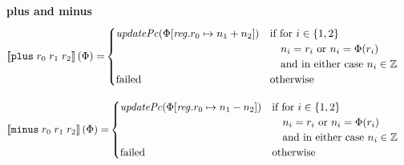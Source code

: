 \documentclass[a4paper]{article}
\newcommand{\sem}[1]{\left\llbracket #1 \right\rrbracket}
\newcommand{\targetcolor}[1]{\color{black}}
\newcommand{\trg}[1]{{\targetcolor{} #1}}
\newcommand{\zinstr}[1]{\texttt{#1}}
\newcommand{\threeinstr}[4]{
  \ifthenelse{\equal{#2#3#4}{}}
  {\zinstr{#1}}
  {\zinstr{#1} \; #2 \; #3 \; #4}
}
\newcommand{\tplus}[3]{\threeinstr{\trg{plus}}{#1}{#2}{#3}}
\newcommand{\tminus}[3]{\threeinstr{\trg{minus}}{#1}{#2}{#3}}
\newcommand{\ints}{\mathbb{Z}}
\newcommand{\update}[2]{[#1 \mapsto #2]}
\newcommand{\updReg}[2]{\update{\reg.#1}{#2}}
\newcommand{\failed}{\mathrm{failed}}
\newcommand{\var}[1]{\mathit{#1}}
\newcommand{\reg}{\var{reg}}
\newcommand{\plainfun}[2]{
  \ifthenelse{\equal{#2}{}}
  {\mathit{#1}}
  {\mathit{#1}(#2)}
}
\newcommand{\updPcAddr}[1]{\plainfun{updatePc}{#1}}
\begin{document}
\noindent\textbf{plus and minus}\\
\begin{align*}
  \sem{\tplus{r_0}{r_1}{r_2}}(\Phi) = &
                                                  \begin{cases}
                                                    \updPcAddr{\Phi\updReg{r_0}{n_1+n_2}} &
                                                    \arraycolsep=0pt
                                                    \begin{array}[t]{l}
                                                      \text{if for $i \in \{1,2\}$}\\
                                                      \quad\text{$n_i = r_i$ or $n_i = \Phi(r_i)$}\\
                                                      \quad\text{and in either case $n_i \in \ints$}\\
                                                    \end{array}\\
                                                    \failed & \text{otherwise}
                                                  \end{cases}  
\end{align*}

\begin{align*}
  \sem{\tminus{r_0}{r_1}{r_2}}(\Phi) = &
                                                  \begin{cases}
                                                    \updPcAddr{\Phi\updReg{r_0}{n_1-n_2}} &
                                                    \arraycolsep=0pt
                                                    \begin{array}[t]{l}
                                                      \text{if for $i \in \{1,2\}$}\\
                                                      \quad\text{$n_i = r_i$ or $n_i = \Phi(r_i)$}\\
                                                      \quad\text{and in either case $n_i \in \ints$}\\
                                                    \end{array}\\
                                                    \failed & \text{otherwise}
                                                  \end{cases}  
\end{align*}
\end{document}

